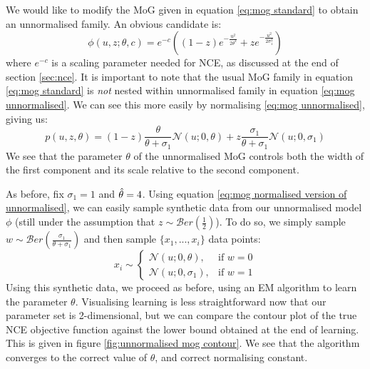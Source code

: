 \documentclass[11pt, oneside]{article}
\newcommand{\pnorm}{p}
\begin{document}
We would like to modify the MoG given in equation \ref{eq:mog standard} to obtain an unnormalised family. An obvious candidate is:
\begin{equation}
\phi(u, z; \theta, c) = e^{-c} \left( (1-z) e^{-\frac{u^2}{2 \theta^2}} + z e^{-\frac{u^2}{2 \sigma_1^2}} \right)
\label{eq:mog unnormalised}
\end{equation}
where $e^{-c}$ is a scaling parameter needed for NCE, as discussed at the end of section \ref{sec:nce}. It is important to note that the usual MoG family in equation \ref{eq:mog standard} is \emph{not} nested within unnormalised family in equation \ref{eq:mog unnormalised}. We can see this more easily by normalising \ref{eq:mog unnormalised}, giving us:
\begin{equation}
    \pnorm(u, z, \theta) = (1-z)\frac{\theta}{\theta + \sigma_1} \mathcal{N}(u; 0, \theta) +
                     z\frac{\sigma_1}{\theta + \sigma_1} \mathcal{N}(u; 0, \sigma_1)
\label{eq:mog normalised version of unnormalised}
\end{equation}
We see that the parameter $\theta$ of the unnormalised MoG controls both the width of the first component and its scale relative to the second component. 

As before, fix $\sigma_1 = 1$ and $\Hat{\theta}=4$. Using equation \ref{eq:mog normalised version of unnormalised}, we can easily sample synthetic data from our unnormalised model $\phi$ (still under the assumption that $z \sim \mathcal{B}er(\frac{1}{2})$). To do so, we simply sample $w \sim \mathcal{B}er(\frac{\sigma_1}{\theta + \sigma_1})$ and then sample $\{x_1, ..., x_i\}$ data points:
\[
    x_i \sim \left\{\begin{array}{lr}
        \mathcal{N}(u; 0, \theta), & \text{if } w = 0\\
         \mathcal{N}(u; 0, \sigma_1), & \text{if } w = 1
        \end{array}
\]
Using this synthetic data, we proceed as before, using an EM algorithm to learn the parameter $\theta$. Visualising learning is less straightforward now that our parameter set is 2-dimensional, but we can compare the contour plot of the true NCE objective function against the lower bound obtained at the end of learning. This is given in figure \ref{fig:unnormalised mog contour}. We see that the algorithm converges to the correct value of $\theta$, and correct normalising constant.

\end{document}
